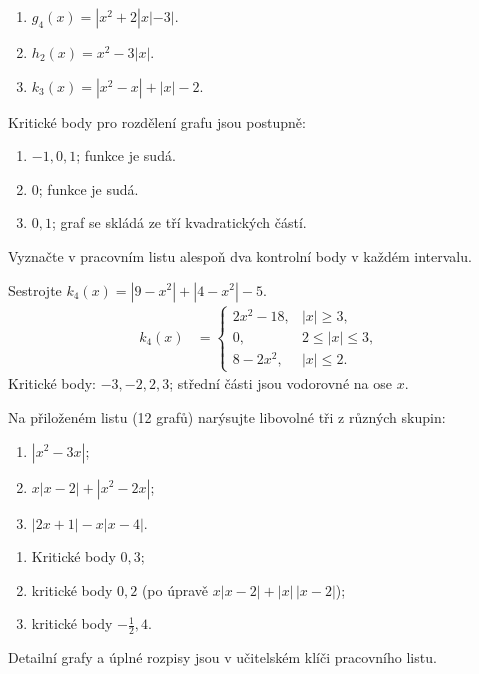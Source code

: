 \documentclass[11pt,a4paper]{article}
\begin{document}
\begin{zadaniReseniBox}[title={Samostatná práce 1}]
\begin{enumerate}[label=\alph*)]
\item $g_4(x)=|x^2+2|x|-3|$.
\item $h_2(x)=x^2-3|x|$.
\item $k_3(x)=|x^2-x|+|x|-2$.
\end{enumerate}
\tcblower
Kritické body pro rozdělení grafu jsou postupně:
\begin{enumerate}[label=\alph*)]
\item $-1,0,1$; funkce je sudá.
\item $0$; funkce je sudá.
\item $0,1$; graf se skládá ze tří kvadratických částí.
\end{enumerate}
Vyznačte v pracovním listu alespoň dva kontrolní body v každém intervalu.
\end{zadaniReseniBox}
\begin{zadaniReseniBox}[title={Rozšíření 1}]
Sestrojte $k_4(x)=|9-x^2|+|4-x^2|-5$.
\tcblower
\[
\begin{aligned}
k_4(x)&=\begin{cases}2x^2-18,&|x|\ge3,\\0,&2\le|x|\le3,\\8-2x^2,&|x|\le2.\end{cases}
\end{aligned}
\]
Kritické body: $-3,-2,2,3$; střední části jsou vodorovné na ose $x$.
\end{zadaniReseniBox}
\begin{zadaniReseniBox}[title={Domácí úkol}]
Na přiloženém listu (12 grafů) narýsujte libovolné tři z různých skupin:
\begin{enumerate}[label=\alph*)]
\item $|x^2-3x|$;
\item $x|x-2|+|x^2-2x|$;
\item $|2x+1|-x|x-4|$.
\end{enumerate}
\tcblower
\begin{enumerate}[label=\alph*)]
\item Kritické body $0,3$;
\item kritické body $0,2$ (po úpravě $x|x-2|+|x|\,|x-2|$);
\item kritické body $-\frac12,4$.
\end{enumerate}
Detailní grafy a úplné rozpisy jsou v učitelském klíči pracovního listu.
\end{zadaniReseniBox}
\end{document}
